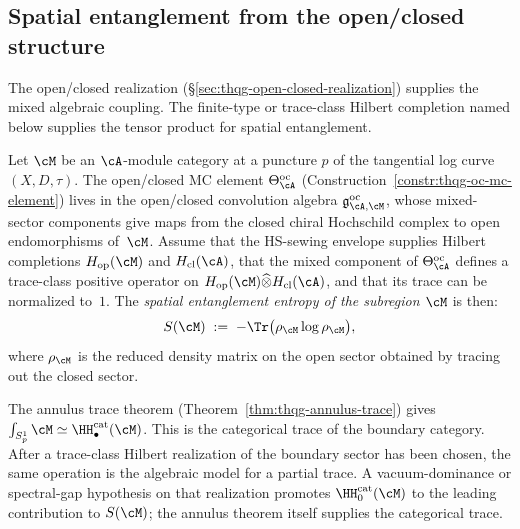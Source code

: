 %
%

\subsection{Spatial entanglement from the open/closed structure}
\label{subsec:thqg-entanglement-spatial}

The open/closed realization
(\S\ref{sec:thqg-open-closed-realization}) supplies the mixed
algebraic coupling.  The finite-type or trace-class Hilbert completion
named below supplies the tensor product for spatial entanglement.

\begin{conjecture}
\ClaimStatusConjectured
\label{conj:thqg-spatial-entanglement}
Let $\cM$ be an $\cA$-module category at a puncture $p$ of the
tangential log curve $(X, D, \tau)$. The open/closed MC element
$\Theta^{\mathrm{oc}}_\cA$
(Construction~\ref{constr:thqg-oc-mc-element})
lives in the open/closed convolution algebra
$\mathfrak{g}^{\mathrm{oc}}_{\cA, \cM}$,
whose mixed-sector components give maps from the closed
chiral Hochschild complex to open endomorphisms of~$\cM$.
Assume that the HS-sewing envelope supplies Hilbert completions
$H_{\mathrm{op}}(\cM)$ and $H_{\mathrm{cl}}(\cA)$, that the mixed
component of $\Theta^{\mathrm{oc}}_\cA$ defines a trace-class
positive operator on
$H_{\mathrm{op}}(\cM)\widehat{\otimes}H_{\mathrm{cl}}(\cA)$,
and that its trace can be normalized to~$1$.  The
\emph{spatial entanglement entropy of the subregion $\cM$} is then:
\begin{equation}\label{eq:thqg-spatial-entanglement}
S(\cM) \;:=\;
-\Tr\bigl(\rho_{\cM} \log \rho_{\cM}\bigr),
\end{equation}
where $\rho_{\cM}$ is the reduced density matrix on the open sector
obtained by tracing out the closed sector.
\end{conjecture}

\begin{remark}
\label{rem:thqg-annulus-as-partial-trace}
The annulus trace theorem (Theorem~\ref{thm:thqg-annulus-trace})
gives $\int_{S^1_p} \cM \simeq \HH^{\mathrm{cat}}_\bullet(\cM)$.
This is the categorical trace of the boundary category.  After a
trace-class Hilbert realization of the boundary sector has been
chosen, the same operation is the algebraic model for a partial
trace.  A vacuum-dominance or spectral-gap hypothesis on that
realization promotes $\HH^{\mathrm{cat}}_0(\cM)$ to the leading
contribution to $S(\cM)$; the annulus theorem itself supplies the
categorical trace.
\end{remark}

